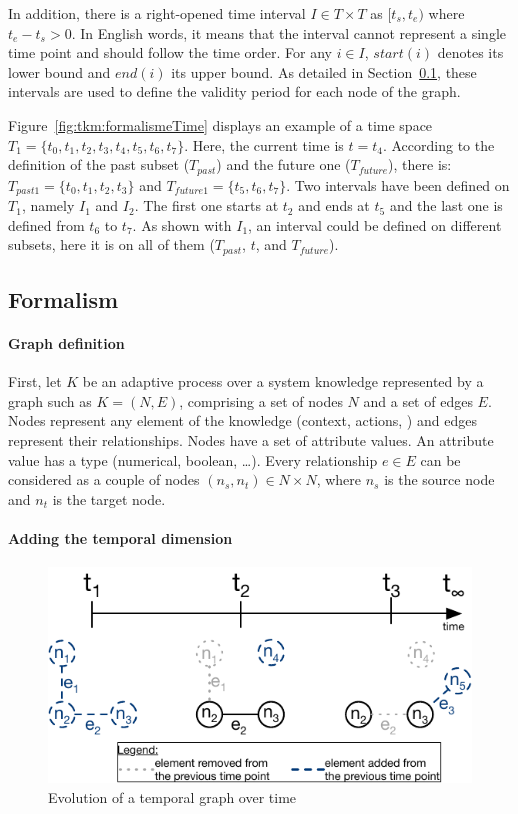 In addition, there is a right-opened time interval $I \in T \times T$ as $[t_s, t_e)$ where $t_e - t_s > 0$.
In English words, it means that the interval cannot represent a single time point and should follow the time order. 
For any $i \in I$, $start(i)$ denotes its lower bound and $end(i)$ its upper bound.
As detailed in Section~\ref{sec:tkm:formalism}, these intervals are used to define the validity period for each node of the graph. 

Figure~\ref{fig:tkm:formalismeTime} displays an example of a time space $T_1 = \{t_0, t_1, t_2, t_3, t_4, t_5, t_6, t_7\}$.
Here, the current time is $t = t_4$.
According to the definition of the past subset ($T_{past}$) and the future one ($T_{future}$), there is: $T_{past1} =  \{t_0, t_1, t_2, t_3\}$ and $T_{future1} = \{t_5, t_6, t_7\}$.
Two intervals have been defined on $T_1$, namely $I_1$ and $I_2$.
The first one starts at $t_2$ and ends at $t_5$ and the last one is defined from $t_6$ to $t_7$.
As shown with $I_1$, an interval could be defined on different subsets, here it is on all of them ($T_{past}$, $t$, and $T_{future}$).

\subsection{Formalism}
\label{sec:tkm:formalism}
 
\paragraph{Graph definition}
First, let $K$ be an adaptive process over a system \gls{knowledge} represented by a graph such as $K = (N, E)$, comprising a set of nodes $N$ and a set of edges $E$.
Nodes represent any element of the knowledge (context, actions, \etc) and edges represent their relationships.
Nodes have a set of attribute values.
An attribute value has a type (numerical, boolean, \ldots). 
Every relationship $e \in E$ can be considered as a couple of nodes $(n_s, n_t) \in N \times N$, where $n_s$ is the source node and $n_t$ is the target node.

\paragraph{Adding the temporal dimension}

\begin{figure}
   \centering
	\includegraphics{img/chapt-tkm/formalism/validityExample}
	\caption{Evolution of a temporal graph over time}
	\label{fig:tkm:validityEx}
\end{figure}

